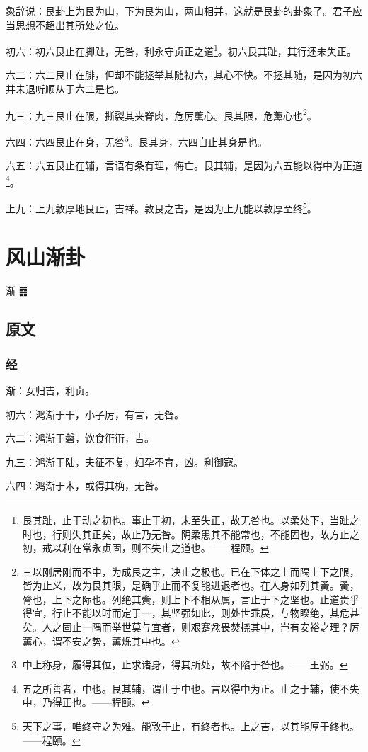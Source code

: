 \documentclass[12pt,oneside]{book}
\begin{document}
象辞说：艮卦上为艮为山，下为艮为山，两山相并，这就是艮卦的卦象了。君子应当思想不超出其所处之位。

初六：初六艮止在脚趾，无咎，利永守贞正之道\footnote{艮其趾，止于动之初也。事止于初，未至失正，故无咎也。以柔处下，当趾之时也，行则失其正矣，故止乃无咎。阴柔患其不能常也，不能固也，故方止之初，戒以利在常永贞固，则不失止之道也。——程颐。}。初六艮其趾，其行还未失正。

六二：六二艮止在腓，但却不能拯举其随初六，其心不快。不拯其随，是因为初六并未退听顺从于六二是也。

九三：九三艮止在限，撕裂其夹脊肉，危厉薰心。艮其限，危薰心也\footnote{三以刚居刚而不中，为成艮之主，决止之极也。已在下体之上而隔上下之限，皆为止义，故为艮其限，是确乎止而不复能进退者也。在人身如列其夤。夤，膂也，上下之际也。列绝其夤，则上下不相从属，言止于下之坚也。止道贵乎得宜，行止不能以时而定于一，其坚强如此，则处世乖戾，与物睽绝，其危甚矣。人之固止一隅而举世莫与宜者，则艰蹇忿畏焚挠其中，岂有安裕之理？厉薰心，谓不安之势，薰烁其中也。}。

六四：六四艮止在身，无咎\footnote{中上称身，履得其位，止求诸身，得其所处，故不陷于咎也。——王弼。}。艮其身，六四自止其身是也。

六五：六五艮止在辅，言语有条有理，悔亡。艮其辅，是因为六五能以得中为正道\footnote{五之所善者，中也。艮其辅，谓止于中也。言以得中为正。止之于辅，使不失中，乃得正也。——程颐。}。

上九：上九敦厚地艮止，吉祥。敦艮之吉，是因为上九能以敦厚至终\footnote{天下之事，唯终守之为难。能敦于止，有终者也。上之吉，以其能厚于终也。——程颐。}。


\chapter{风山渐卦}
渐 {\Large ䷴}


\section{原文}

\subsection{经}
渐：女归吉，利贞。

初六：鸿渐于干，小子厉，有言，无咎。

六二：鸿渐于磐，饮食衎衎，吉。

九三：鸿渐于陆，夫征不复，妇孕不育，凶。利御寇。

六四：鸿渐于木，或得其桷，无咎。
\end{document}
